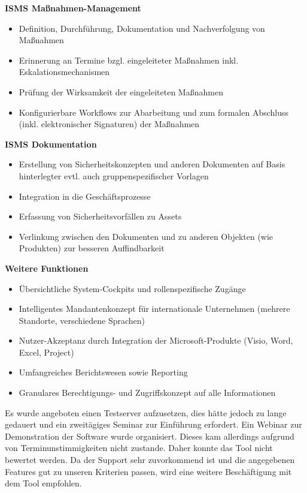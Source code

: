 \textbf{ISMS Maßnahmen-Management}
\begin{itemize}
\itemsep0em
\item Definition, Durchführung, Dokumentation und Nachverfolgung von Maßnahmen
\item Erinnerung an Termine bzgl. eingeleiteter Maßnahmen inkl. Eskalationsmechanismen
\item Prüfung der Wirksamkeit der eingeleiteten Maßnahmen
\item Konfigurierbare Workflows zur Abarbeitung und zum formalen Abschluss (inkl. elektronischer Signaturen) der Maßnahmen
\end{itemize}

\textbf{ISMS Dokumentation}
\begin{itemize}
\itemsep0em
\item Erstellung von Sicherheitskonzepten und anderen Dokumenten auf Basis hinterlegter evtl. auch gruppenspezifischer Vorlagen
\item Integration in die Geschäftsprozesse
\item Erfassung von Sicherheitsvorfällen zu Assets
\item Verlinkung zwischen den Dokumenten und zu anderen Objekten (wie Produkten) zur besseren Auffindbarkeit
\end{itemize}

\textbf{Weitere Funktionen}
\begin{itemize}
\itemsep0em
\item Übersichtliche System-Cockpits und rollenspezifische Zugänge
\item Intelligentes Mandantenkonzept für internationale Unternehmen (mehrere Standorte,  verschiedene Sprachen)
\item Nutzer-Akzeptanz durch Integration der Microsoft-Produkte (Visio, Word, Excel, Project)
\item Umfangreiches Berichtswesen sowie Reporting
\item Granulares Berechtigungs- und Zugriffskonzept auf alle Informationen
\end{itemize}

Es wurde angeboten einen Testserver aufzusetzen, dies hätte jedoch zu lange gedauert und ein zweitägiges Seminar zur Einführung erfordert. Ein Webinar zur Demonstration der Software wurde organisiert. Dieses kam allerdings aufgrund von Terminunstimmigkeiten nicht zustande. Daher konnte das Tool nicht bewertet werden. Da der Support sehr zuvorkommend ist und die angegebenen Features gut zu unseren Kriterien passen, wird eine weitere Beschäftigung mit dem Tool empfohlen.